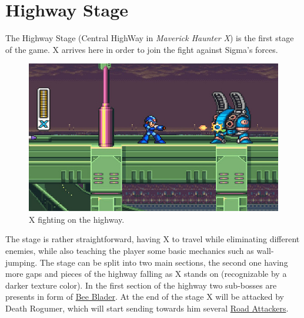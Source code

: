 \section{Highway Stage}
The Highway Stage (Central HighWay in \textit{Maverick Haunter X}) is the first stage of the game. X arrives here in order to join the fight against Sigma's forces.
\begin{figure}
	\centering
	\includegraphics[width=\linewidth]{figures/X1/Highway_screenshot_1.jpg}
	\caption{X fighting on the highway.}
\end{figure}


 The stage is rather straightforward, having X to travel while eliminating different enemies, while also teaching the player some basic mechanics such as wall-jumping.  The stage can be split into two main sections\cite{stratwiki:HighWay}, the second one having more gaps and pieces of the highway falling as X stands on (recognizable by a darker texture color). In the first section of the highway two sub-bosses are presents in form of \hyperlink{miniboss:Bee_Blader}{Bee Blader}. At the end of the stage X will be attacked by Death Rogumer, which will start sending towards him several \hyperlink{enem:Road_Attackers}{Road Attackers}.
% 
 
